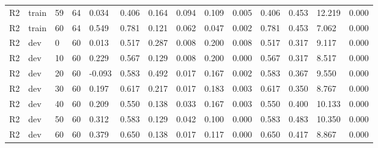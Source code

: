 \begin{table}[t]
\begin{tabular}{llllllllllllll}
R2 & train & 59 & 64 & 0.034 & 0.406 & 0.164 & 0.094 & 0.109 & 0.005 & 0.406 & 0.453 & 12.219 & 0.000 \\
R2 & train & 60 & 64 & 0.549 & 0.781 & 0.121 & 0.062 & 0.047 & 0.002 & 0.781 & 0.453 & 7.062 & 0.000 \\
R2 & dev & 0 & 60 & 0.013 & 0.517 & 0.287 & 0.008 & 0.200 & 0.008 & 0.517 & 0.317 & 9.117 & 0.000 \\
R2 & dev & 10 & 60 & 0.229 & 0.567 & 0.129 & 0.008 & 0.200 & 0.000 & 0.567 & 0.317 & 8.517 & 0.000 \\
R2 & dev & 20 & 60 & -0.093 & 0.583 & 0.492 & 0.017 & 0.167 & 0.002 & 0.583 & 0.367 & 9.550 & 0.000 \\
R2 & dev & 30 & 60 & 0.197 & 0.617 & 0.217 & 0.017 & 0.183 & 0.003 & 0.617 & 0.350 & 8.767 & 0.000 \\
R2 & dev & 40 & 60 & 0.209 & 0.550 & 0.138 & 0.033 & 0.167 & 0.003 & 0.550 & 0.400 & 10.133 & 0.000 \\
R2 & dev & 50 & 60 & 0.312 & 0.583 & 0.129 & 0.042 & 0.100 & 0.000 & 0.583 & 0.483 & 10.350 & 0.000 \\
R2 & dev & 60 & 60 & 0.379 & 0.650 & 0.138 & 0.017 & 0.117 & 0.000 & 0.650 & 0.417 & 8.867 & 0.000 \\
\hline
\end{tabular}
\end{table}
